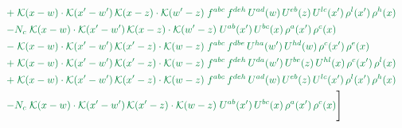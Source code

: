 \documentclass[10pt]{article}
\numberwithin{equation}{section}
\begin{document}
\begin{align}
&\quad{\color{JIM}+\;\mathcal{K}(x-w)\cdot\mathcal{K}(x'-w')\,\mathcal{K}(x-z)\cdot\mathcal{K}(w'-z)\;f^{abc}\,f^{deh}\,U^{ad}(w)\,U^{eb}(z)\,U^{lc}(x')\,\rho^{l}(x')\,\rho^{h}(x)}\notag\\
&\quad{\color{JIM}-N_c\;\mathcal{K}(x-w)\cdot\mathcal{K}(x'-w')\,\mathcal{K}(x-z)\cdot\mathcal{K}(w'-z)\;U^{ab}(x')\,U^{bc}(x)\,\rho^{a}(x')\,\rho^{c}(x)}\notag\\
&\quad{\color{JIM}-\;\mathcal{K}(x-w)\cdot\mathcal{K}(x'-w')\,\mathcal{K}(x'-z)\cdot\mathcal{K}(w-z)\;f^{abc}\,f^{dbe}\,U^{ha}(w')\,U^{hd}(w)\,\rho^{c}(x')\,\rho^{e}(x)}\notag\\
&\quad{\color{JIM}+\;\mathcal{K}(x-w)\cdot\mathcal{K}(x'-w')\,\mathcal{K}(x'-z)\cdot\mathcal{K}(w-z)\;f^{abc}\,f^{deh}\,U^{da}(w')\,U^{be}(z)\,U^{hl}(x)\,\rho^{c}(x')\,\rho^{l}(x)}\notag\\
&\quad{\color{JIM}+\;\mathcal{K}(x-w)\cdot\mathcal{K}(x'-w')\,\mathcal{K}(x'-z)\cdot\mathcal{K}(w-z)\;f^{abc}\,f^{deh}\,U^{ad}(w)\,U^{eb}(z)\,U^{lc}(x')\,\rho^{l}(x')\,\rho^{h}(x)}\notag\\
&\quad{\color{JIM}-N_c\;\mathcal{K}(x-w)\cdot\mathcal{K}(x'-w')\,\mathcal{K}(x'-z)\cdot\mathcal{K}(w-z)\;U^{ab}(x')\,U^{bc}(x)\,\rho^{a}(x')\,\rho^{c}(x)}\Bigg]\label{eq:gen5}
\end{align}
\end{document}
